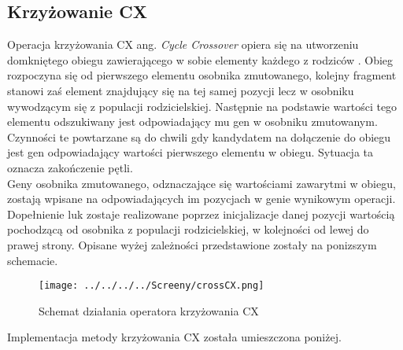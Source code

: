 
\subsection{Krzyżowanie CX}\label{sec:kompilacja}

Operacja krzyżowania CX  ang. \textit{Cycle Crossover} opiera się na utworzeniu domkniętego obiegu zawierającego w sobie elementy każdego z rodziców \cite{crossovers}. Obieg rozpoczyna się od pierwszego elementu osobnika zmutowanego, kolejny fragment stanowi zaś element znajdujący się na tej samej pozycji lecz w osobniku wywodzącym się z populacji rodzicielskiej. Następnie na podstawie wartości tego elementu odszukiwany jest odpowiadający mu gen w osobniku zmutowanym. Czynności te powtarzane są do chwili gdy kandydatem na dołączenie do obiegu jest gen odpowiadający wartości pierwszego elementu w obiegu. Sytuacja ta oznacza zakończenie pętli. \\
Geny osobnika zmutowanego, odznaczające się wartościami zawarytmi w obiegu, zostają wpisane na odpowiadających im pozycjach w genie wynikowym operacji. Dopełnienie luk zostaje realizowane poprzez inicjalizacje danej pozycji wartością pochodzącą od osobnika z populacji rodzicielskiej, w kolejności od lewej do prawej strony. Opisane wyżej zależności przedstawione zostały na ponizszym schemacie.

\begin{figure}[h!]
\centering
		\texttt{[image: ../../../../Screeny/crossCX.png]}
		\caption{Schemat działania operatora krzyżowania CX}
		\label{schematCX}			
\end{figure}

Implementacja metody krzyżowania CX została umieszczona poniżej.

